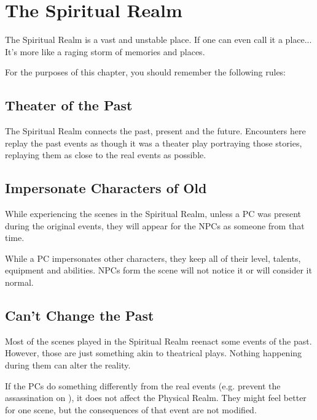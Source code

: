 \section{The Spiritual Realm}
\label{sec:rulesOfTheRealm}

The Spiritual Realm is a vast and unstable place. If one can even call it a place... It's more like a raging storm of memories and places.

For the purposes of this chapter, you should remember the following rules:




\subsection{Theater of the Past}

The Spiritual Realm connects the past, present and the future. Encounters here replay the past events as though it was a theater play portraying those stories, replaying them as close to the real events as possible.




\subsection{Impersonate Characters of Old}

While experiencing the scenes in the Spiritual Realm, unless a PC was present during the original events, they will appear for the NPCs as someone from that time. 

While a PC impersonates other characters, they keep all of their level, talents, equipment and abilities. NPCs form the scene will not notice it or will consider it normal.




\subsection{Can't Change the Past}

Most of the scenes played in the Spiritual Realm reenact some events of the past. However, those are just something akin to theatrical plays. Nothing happening during them can alter the reality.

If the PCs do something differently from the real events (e.g. prevent the assassination on \npcDeadKing{}), it does not affect the Physical Realm. They might feel better for one scene, but the consequences of that event are not modified.



